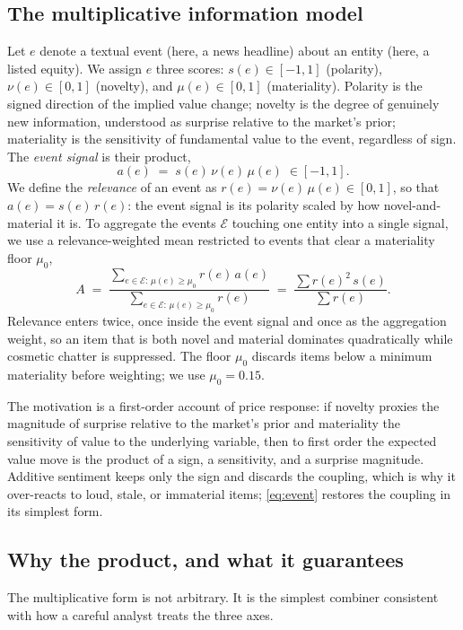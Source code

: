 \documentclass{elektr}
\begin{document}
\subsection{The multiplicative information model}
\label{sec:model}
Let $e$ denote a textual event (here, a news headline) about an entity (here, a listed equity). We assign $e$ three scores: $s(e)\in[-1,1]$ (polarity), $\nu(e)\in[0,1]$ (novelty), and $\mu(e)\in[0,1]$ (materiality). Polarity is the signed direction of the implied value change; novelty is the degree of genuinely new information, understood as surprise relative to the market's prior; materiality is the sensitivity of fundamental value to the event, regardless of sign. The \emph{event signal} is their product,
\begin{equation}
\label{eq:event}
a(e) \;=\; s(e)\,\nu(e)\,\mu(e)\;\in[-1,1].
\end{equation}
We define the \emph{relevance} of an event as $r(e)=\nu(e)\,\mu(e)\in[0,1]$, so that $a(e)=s(e)\,r(e)$: the event signal is its polarity scaled by how novel-and-material it is. To aggregate the events $\mathcal{E}$ touching one entity into a single signal, we use a relevance-weighted mean restricted to events that clear a materiality floor $\mu_0$,
\begin{equation}
\label{eq:agg}
A \;=\; \frac{\sum_{e\in\mathcal{E}:\,\mu(e)\ge\mu_0} r(e)\,a(e)}{\sum_{e\in\mathcal{E}:\,\mu(e)\ge\mu_0} r(e)}\;=\;\frac{\sum r(e)^2\,s(e)}{\sum r(e)}.
\end{equation}
Relevance enters twice, once inside the event signal and once as the aggregation weight, so an item that is both novel and material dominates quadratically while cosmetic chatter is suppressed. The floor $\mu_0$ discards items below a minimum materiality before weighting; we use $\mu_0=0.15$.

The motivation is a first-order account of price response: if novelty proxies the magnitude of surprise relative to the market's prior and materiality the sensitivity of value to the underlying variable, then to first order the expected value move is the product of a sign, a sensitivity, and a surprise magnitude. Additive sentiment keeps only the sign and discards the coupling, which is why it over-reacts to loud, stale, or immaterial items; \eqref{eq:event} restores the coupling in its simplest form.

\subsection{Why the product, and what it guarantees}
\label{sec:theory}
The multiplicative form is not arbitrary. It is the simplest combiner consistent with how a careful analyst treats the three axes.
\end{document}
